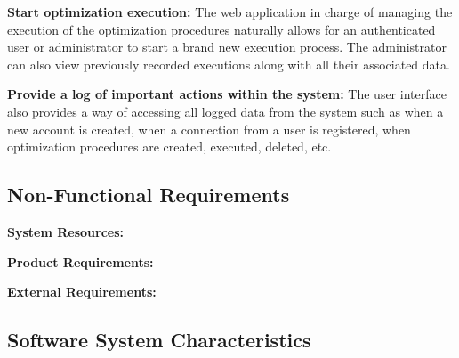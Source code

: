 \documentclass{article}
\begin{document}
\noindent\textbf{Start optimization execution:}
The web application in charge of managing the execution of the optimization procedures naturally allows for an authenticated user or administrator to start a brand new execution process. The administrator can also view previously recorded executions along with all their associated data.\\\par

\noindent\textbf{Provide a log of important actions within the system:}
The user interface also provides a way of accessing all logged data from the system such as when a new account is created, when a connection from a user is registered, when optimization procedures are created, executed, deleted, etc.



\subsection{Non-Functional Requirements}

\par
\textbf{System Resources:}
\\\par

\noindent\textbf{Product Requirements:}
\\\par

\noindent\textbf{External Requirements:}
\\\par


\subsection{Software System Characteristics}
\end{document}
